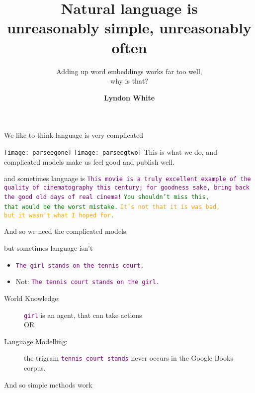 \documentclass[dvipsnames]{beamer}
\institute{Department of Electical, Electronic and Computer Engineering\\The University of Western Australia}
\date{}
\title{Natural language is \\ unreasonably simple, unreasonably often}
\subtitle{Adding up word embeddings works far too well,\\ why is that?}
\author{
	\textbf{Lyndon White}}
\let\oldnote\note
\renewcommand{\note}{\oldnote[item]}
\renewcommand{\emph}{\alert}
\newcommand{\countertitle}[1]{\vfill\vfill{\centering \Large \color{bluewrite} #1}\vspace{-0.5cm}}
\newcommand{\natlang}[1]{\textcolor{Purple}{\texttt{#1}}}
\begin{document}
\centering %
\frame{\maketitle}
\logo{}

%

\begin{frame}{We like to think language is very complicated}
	
	\texttt{[image: parseegone]}
	\vfill
	\texttt{[image: parseegtwo]}
	\vfill	
	\vfill	
	\countertitle{This is what we do, and complicated models make us feel good and publish well.}
\end{frame}

\begin{frame}{and sometimes language is}
	\vfill
	\natlang{This movie is a truly excellent example of the quality of cinematography this century; for goodness sake, bring back the good old days of real cinema!}
	\vfill
	\natlang{\textcolor{Green}{You shouldn't miss this,\\ that would be the worst mistake.}}
	\vfill
	\natlang{\textcolor{Orange}{It's not that it is was bad,\\ but it wasn't what I hoped for.}}
	
	\countertitle{And so we need the complicated models.}
	\vfill
\end{frame}

\begin{frame}{but sometimes language isn't}
	\begin{itemize}
		\item \natlang{The girl stands on the tennis court.}
		\item Not: \natlang{The tennis court stands on the girl.}
	\end{itemize}
	\vfill
	\pause
	\begin{description}
		\item[World Knowledge:] \natlang{girl} is an \emph{agent}, that can take \emph{actions}%
		\\
		\hfill OR\hfill\hfill\hfill\null
		\item[Language Modelling:] the trigram \natlang{tennis court stands} never occurs in the Google Books corpus.
	\end{description}
	\countertitle{And so simple methods work}
\end{frame}
\end{document}
